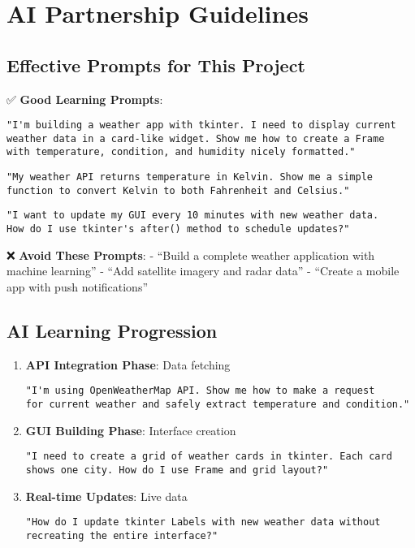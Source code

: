 \documentclass[
  letterpaper,
  DIV=11,
  numbers=noendperiod,
  oneside]{scrreprt}
\begin{document}
\section{AI Partnership Guidelines}\label{ai-partnership-guidelines-9}

\subsection{Effective Prompts for This
Project}\label{effective-prompts-for-this-project-9}

✅ \textbf{Good Learning Prompts}:

\begin{verbatim}
"I'm building a weather app with tkinter. I need to display current 
weather data in a card-like widget. Show me how to create a Frame 
with temperature, condition, and humidity nicely formatted."
\end{verbatim}

\begin{verbatim}
"My weather API returns temperature in Kelvin. Show me a simple 
function to convert Kelvin to both Fahrenheit and Celsius."
\end{verbatim}

\begin{verbatim}
"I want to update my GUI every 10 minutes with new weather data. 
How do I use tkinter's after() method to schedule updates?"
\end{verbatim}

❌ \textbf{Avoid These Prompts}: - ``Build a complete weather
application with machine learning'' - ``Add satellite imagery and radar
data'' - ``Create a mobile app with push notifications''

\subsection{AI Learning Progression}\label{ai-learning-progression-9}

\begin{enumerate}
\def\labelenumi{\arabic{enumi}.}
\item
  \textbf{API Integration Phase}: Data fetching

\begin{verbatim}
"I'm using OpenWeatherMap API. Show me how to make a request 
for current weather and safely extract temperature and condition."
\end{verbatim}
\item
  \textbf{GUI Building Phase}: Interface creation

\begin{verbatim}
"I need to create a grid of weather cards in tkinter. Each card 
shows one city. How do I use Frame and grid layout?"
\end{verbatim}
\item
  \textbf{Real-time Updates}: Live data

\begin{verbatim}
"How do I update tkinter Labels with new weather data without 
recreating the entire interface?"
\end{verbatim}
\end{enumerate}
\end{document}

